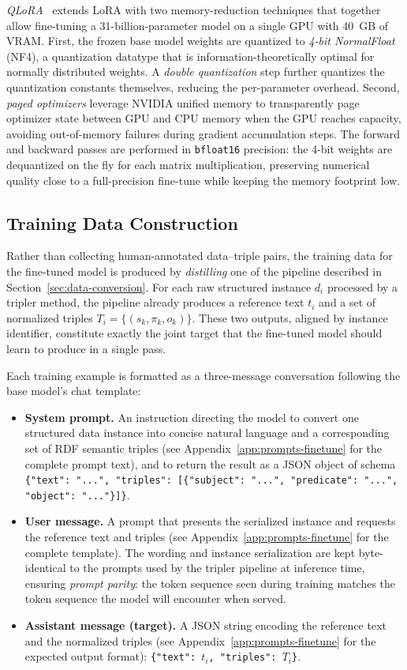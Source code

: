 \emph{QLoRA}~\cite{dettmers2023qlora} extends LoRA with two memory-reduction techniques that together allow fine-tuning a 31-billion-parameter model on a single GPU with 40~GB of VRAM. First, the frozen base model weights are quantized to \emph{4-bit NormalFloat} (NF4), a quantization datatype that is information-theoretically optimal for normally distributed weights. A \emph{double quantization} step further quantizes the quantization constants themselves, reducing the per-parameter overhead. Second, \emph{paged optimizers} leverage NVIDIA unified memory to transparently page optimizer state between GPU and CPU memory when the GPU reaches capacity, avoiding out-of-memory failures during gradient accumulation steps. The forward and backward passes are performed in \texttt{bfloat16} precision: the 4-bit weights are dequantized on the fly for each matrix multiplication, preserving numerical quality close to a full-precision fine-tune while keeping the memory footprint low.

\subsection{Training Data Construction}

Rather than collecting human-annotated data--triple pairs, the training data for the fine-tuned model is produced by \emph{distilling} one of the pipeline described in Section~\ref{sec:data-conversion}. For each raw structured instance $d_i$ processed by a tripler method, the pipeline already produces a reference text $t_i$ and a set of normalized triples $T_i = \{(s_k, \pi_k, o_k)\}$. These two outputs, aligned by instance identifier, constitute exactly the joint target that the fine-tuned model should learn to produce in a single pass.

Each training example is formatted as a three-message conversation following the base model's chat template:

\begin{itemize}
  \item \textbf{System prompt.} An instruction directing the model to convert one structured data instance into concise natural language and a corresponding set of RDF semantic triples (see Appendix~\ref{app:prompts-finetune} for the complete prompt text), and to return the result as a JSON object of schema \texttt{\{"text": "...", "triples": [\{"subject": "...", "predicate": "...", "object": "..."\}]\}}.
  \item \textbf{User message.} A prompt that presents the serialized instance and requests the reference text and triples (see Appendix~\ref{app:prompts-finetune} for the complete template). The wording and instance serialization are kept byte-identical to the prompts used by the tripler pipeline at inference time, ensuring \emph{prompt parity}: the token sequence seen during training matches the token sequence the model will encounter when served.
  \item \textbf{Assistant message (target).} A JSON string encoding the reference text and the normalized triples (see Appendix~\ref{app:prompts-finetune} for the expected output format): \texttt{\{"text": $t_i$, "triples": $T_i$\}}.
\end{itemize}

